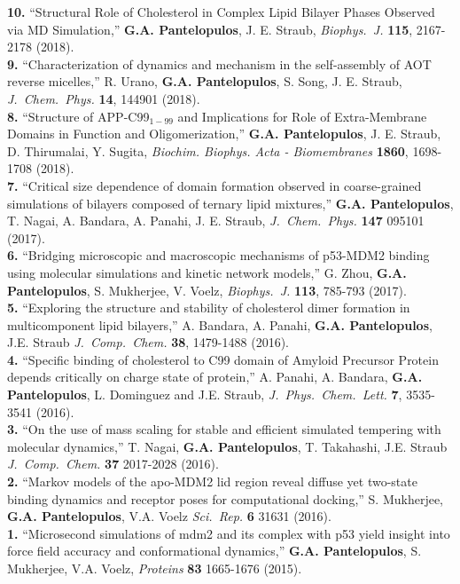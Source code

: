 \documentclass[a4paper]{article}
\def\jcc{\it J.~Comp.~Chem.}
\def\jpcl{\it J.~Phys.~Chem.~Lett.}
\def\prot{\it Proteins}
\def\jcp{\it J.~Chem.~Phys.}
\def\bj{\it Biophys.~J.}
\def\jpcl{\it J.~Phys.~Chem.~Lett.}
\def\scirep{\it Sci.~Rep.}
\begin{document}
{\bf 10.} ``Structural Role of Cholesterol in Complex Lipid Bilayer Phases Observed via MD Simulation,'' \textbf{G.A. Pantelopulos}, J. E. Straub, {\bj} {\bf 115}, 2167-2178 (2018). \\
{\bf 9.} ``Characterization of dynamics and mechanism in the self-assembly of AOT reverse micelles,'' R. Urano, \textbf{G.A. Pantelopulos}, S. Song, J. E. Straub, {\jcp} {\bf 14}, 144901 (2018). \\
{\bf 8.} ``Structure of APP-C99$_{1-99}$ and Implications for Role of Extra-Membrane Domains in Function and Oligomerization,'' \textbf{G.A. Pantelopulos}, J. E. Straub, D. Thirumalai, Y. Sugita, \textit{Biochim. Biophys. Acta - Biomembranes} {\bf 1860}, 1698-1708 (2018). \\
{\bf 7.} ``Critical size dependence of domain formation observed in coarse-grained simulations of bilayers composed of ternary lipid mixtures,'' \textbf{G.A. Pantelopulos}, T. Nagai, A. Bandara, A. Panahi, J. E. Straub, {\jcp} {\bf 147} 095101 (2017). \\
{\bf 6.} ``Bridging microscopic and macroscopic mechanisms of p53-MDM2 binding using molecular simulations and kinetic network models,'' G. Zhou, \textbf{G.A. Pantelopulos}, S. Mukherjee, V. Voelz, {\bj} {\bf 113},  785-793 (2017). \\
{\bf 5.} ``Exploring the structure and stability of cholesterol dimer formation in multicomponent lipid bilayers,'' A. Bandara, A. Panahi, \textbf{G.A. Pantelopulos}, J.E. Straub {\jcc} {\bf 38}, 1479-1488 (2016). \\
{\bf 4.}  ``Specific binding of cholesterol to C99 domain of Amyloid Precursor Protein depends critically on charge state of protein,'' A. Panahi, A. Bandara, \textbf{G.A. Pantelopulos}, L. Dominguez and J.E. Straub, {\jpcl} {\bf 7}, 3535-3541 (2016). \\
{\bf 3.} ``On the use of mass scaling for stable and efficient simulated tempering with molecular dynamics,'' T. Nagai, \textbf{G.A. Pantelopulos}, T. Takahashi, J.E. Straub {\jcc} {\bf 37} 2017-2028 (2016). \\
{\bf 2.} ``Markov models of the apo-MDM2 lid region reveal diffuse yet two-state binding dynamics and receptor poses for computational docking,'' S. Mukherjee, \textbf{G.A. Pantelopulos}, V.A. Voelz {\scirep} {\bf 6} 31631 (2016). \\
{\bf 1.} ``Microsecond simulations of mdm2 and its complex with p53 yield insight into force field accuracy and conformational dynamics,'' \textbf{G.A. Pantelopulos}, S. Mukherjee, V.A. Voelz, {\prot} {\bf 83} 1665-1676 (2015).
\end{document}
